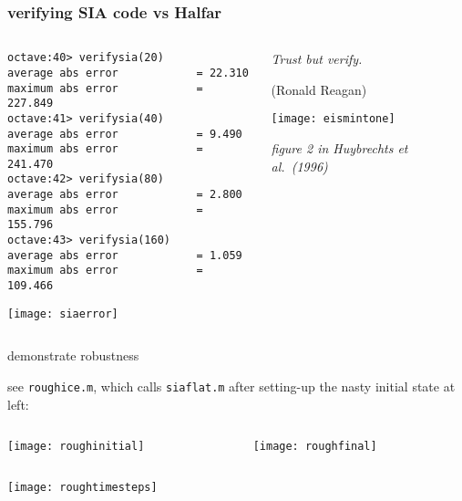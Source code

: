 \begin{frame}[fragile]
\frametitle{verifying SIA code vs Halfar}
\label{slide:verifysia}

\begin{columns}
\begin{column}{0.6\textwidth}
\scriptsize
\begin{verbatim}
octave:40> verifysia(20)
average abs error            = 22.310
maximum abs error            = 227.849
octave:41> verifysia(40)
average abs error            = 9.490
maximum abs error            = 241.470
octave:42> verifysia(80)
average abs error            = 2.800
maximum abs error            = 155.796
octave:43> verifysia(160)
average abs error            = 1.059
maximum abs error            = 109.466
\end{verbatim}
\normalsize

\texttt{[image: siaerror]}
\end{column}

\begin{column}{0.4\textwidth}
\small
\emph{Trust but verify.}
\medskip

\scriptsize
(Ronald Reagan)

\bigskip\bigskip\bigskip

\texttt{[image: eismintone]}

\scriptsize \emph{figure 2 in Huybrechts et al.~(1996)}\nocite{EISMINT96}
\end{column}
\end{columns}
\end{frame}


\begin{frame}{demonstrate robustness}

see \texttt{roughice.m}, which calls \texttt{siaflat.m} after setting-up the nasty initial state at left:
\medskip

\begin{columns}
\begin{column}{0.5\textwidth}
\texttt{[image: roughinitial]}
\end{column}
\begin{column}{0.5\textwidth}
\texttt{[image: roughfinal]}
\end{column}
\end{columns}

\begin{center}
\texttt{[image: roughtimesteps]}
\end{center}
\end{frame}



